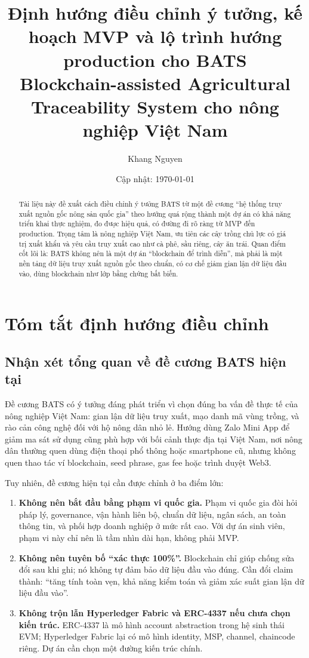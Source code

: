 \documentclass[12pt,a4paper]{article}
\title{\textbf{Định hướng điều chỉnh ý tưởng, kế hoạch MVP và lộ trình hướng production cho BATS}\\
\large Blockchain-assisted Agricultural Traceability System cho nông nghiệp Việt Nam}
\author{Khang Nguyen}
\date{Cập nhật: \today}
\begin{document}
\maketitle

\begin{abstract}
Tài liệu này đề xuất cách điều chỉnh ý tưởng BATS từ một đề cương ``hệ thống truy xuất nguồn gốc nông sản quốc gia'' theo hướng quá rộng thành một dự án có khả năng triển khai thực nghiệm, đo được hiệu quả, có đường đi rõ ràng từ MVP đến production. Trọng tâm là nông nghiệp Việt Nam, ưu tiên các cây trồng chủ lực có giá trị xuất khẩu và yêu cầu truy xuất cao như cà phê, sầu riêng, cây ăn trái. Quan điểm cốt lõi là: BATS không nên là một dự án ``blockchain để trình diễn'', mà phải là một nền tảng dữ liệu truy xuất nguồn gốc theo chuẩn, có cơ chế giảm gian lận dữ liệu đầu vào, dùng blockchain như lớp bằng chứng bất biến.
\end{abstract}

\tableofcontents
\newpage

\section{Tóm tắt định hướng điều chỉnh}

\subsection{Nhận xét tổng quan về đề cương BATS hiện tại}

Đề cương BATS có ý tưởng đáng phát triển vì chọn đúng ba vấn đề thực tế của nông nghiệp Việt Nam: gian lận dữ liệu truy xuất, mạo danh mã vùng trồng, và rào cản công nghệ đối với hộ nông dân nhỏ lẻ. Hướng dùng Zalo Mini App để giảm ma sát sử dụng cũng phù hợp với bối cảnh thực địa tại Việt Nam, nơi nông dân thường quen dùng điện thoại phổ thông hoặc smartphone cũ, nhưng không quen thao tác ví blockchain, seed phrase, gas fee hoặc trình duyệt Web3.

Tuy nhiên, đề cương hiện tại cần được chỉnh ở ba điểm lớn:

\begin{enumerate}[leftmargin=2em]
    \item \textbf{Không nên bắt đầu bằng phạm vi quốc gia.} Phạm vi quốc gia đòi hỏi pháp lý, governance, vận hành liên bộ, chuẩn dữ liệu, ngân sách, an toàn thông tin, và phối hợp doanh nghiệp ở mức rất cao. Với dự án sinh viên, phạm vi này chỉ nên là tầm nhìn dài hạn, không phải MVP.
    \item \textbf{Không nên tuyên bố ``xác thực 100\%''.} Blockchain chỉ giúp chống sửa đổi sau khi ghi; nó không tự đảm bảo dữ liệu đầu vào đúng. Cần đổi claim thành: ``tăng tính toàn vẹn, khả năng kiểm toán và giảm xác suất gian lận dữ liệu đầu vào''.
    \item \textbf{Không trộn lẫn Hyperledger Fabric và ERC-4337 nếu chưa chọn kiến trúc.} ERC-4337 là mô hình account abstraction trong hệ sinh thái EVM; Hyperledger Fabric lại có mô hình identity, MSP, channel, chaincode riêng. Dự án cần chọn một đường kiến trúc chính.
\end{enumerate}
\end{document}
